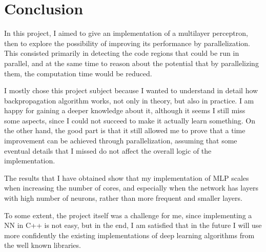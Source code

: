 \documentclass{article}
\begin{document}
\section{Conclusion}
In this project, I aimed to give an implementation of a multilayer perceptron, then to explore the possibility of improving its performance by parallelization. This consisted primarily in detecting the code regions that could be run in parallel, and at the same time to reason about the potential that by parallelizing them, the computation time would be reduced.

I mostly chose this project subject because I wanted to understand in detail how backpropagation algorithm works, not only in theory, but also in practice. I am happy for gaining a deeper knowledge about it, although it seems I still miss some aspects, since I could not succeed to make it actually learn something. On the other hand, the good part is that it still allowed me to prove that a time improvement can be achieved through parallelization, assuming that some eventual details that I missed do not affect the overall logic of the implementation.

The results that I have obtained show that my implementation of MLP scales when increasing the number of cores, and especially when the network has layers with high number of neurons, rather than more frequent and smaller layers.

To some extent, the project itself was a challenge for me, since implementing a NN in C++ is not easy, but in the end, I am satisfied that in the future I will use more confidently the existing implementations of deep learning algorithms from the well known libraries.


	\newpage
	
	
	
	
	
	
\end{document}
